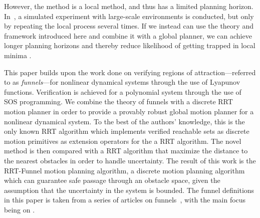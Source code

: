 However, the method is a local method, and thus has a limited planning horizon.
In~\cite{majumdarFunnelLibrariesRealtime2017}, a simulated experiment with large-scale environments is conducted, but only by repeating the local process several times. 
If we instead can use the theory and framework introduced here and combine it with a global planner, we can achieve longer planning horizons and thereby reduce likelihood of getting trapped in local minima .

This paper builds upon the work done on verifying regions of attraction---referred to as \emph{funnels}---for nonlinear dynamical systems through the use of Lyapunov functions. Verification is achieved for a polynomial system through the use of SOS programming.
We combine the theory of funnels with a discrete RRT motion planner in order to provide a provably robust global motion planner for a nonlinear dynamical system. 
To the best of the authors' knowledge, this is the only known RRT algorithm which implements verified reachable sets as discrete motion primitives as extension operators for the a RRT algorithm. 
The novel method is then compared with a RRT algorithm that maximize the distance to the nearest obstacles in order to handle uncertainty.
The result of this work is the RRT-Funnel motion planning algorithm, a discrete motion planning algorithm which can guarantee safe passage through an obstacle space, given the assumption that the uncertainty in the system is bounded. 
The funnel definitions in this paper is taken from a series of articles on funnels~\cite{Tobenkin_2011,tedrakeLQRtreesFeedbackMotion2009,
  majumdarRobustOnlineMotion2013,
  majumdarFunnelLibrariesRealtime2017,ahmadi2014dsos}, with the main focus being
on \cite{majumdarFunnelLibrariesRealtime2017}.



